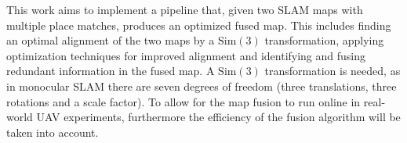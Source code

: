 This work aims to implement a pipeline that, given two SLAM maps with multiple place matches, produces an optimized fused map. This includes finding an optimal alignment of the two maps by a $\text{Sim}(3)$ transformation, applying optimization techniques for improved alignment and identifying and fusing redundant information in the fused map. A $\text{Sim}(3)$ transformation is needed, as in monocular \ac{SLAM} there are seven degrees of freedom (three translations, three rotations and a scale factor). To allow for the map fusion to run online in real-world UAV experiments, furthermore the efficiency of the fusion algorithm will be taken into account.




